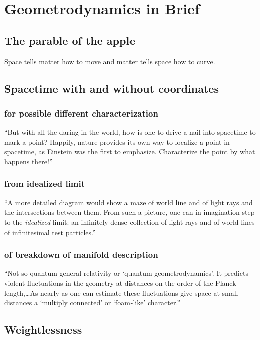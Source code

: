 \section{Geometrodynamics in Brief}\label{sec:chapter1}


\subsection{The parable of the apple}\label{susec:1_1}
Space tells matter how to move and matter tells space how to curve.

\subsection{Spacetime with and without coordinates}\label{susec:1_2}
\subsubsection{\hint for possible different characterization }

\enquote{But with all the daring in the world, how is one to drive a nail into spacetime to mark a point? Happily, nature provides its own way to localize a point in spacetime, as Einstein was the first to emphasize. Characterize the point by what happens there!}

\subsubsection{\hint from idealized limit }

\enquote{A more detailed diagram would show a maze of world line and of light rays and the intersections between them. From such a picture, one can in imagination step to the \emph{idealized} limit: an infinitely dense collection of light rays and of world lines of infinitesimal test particles.}

\subsubsection{\hint of breakdown of manifold description }
\enquote{Not so quantum general relativity or \enquote{quantum geometrodynamics}. It predicts violent fluctuations in the geometry at distances on the order of the Planck length,\dots As nearly as one can estimate these fluctuations give space at small distances a \enquote{multiply connected} or \enquote{foam-like} character.}

\subsection{Weightlessness}\label{susec:1_3}
